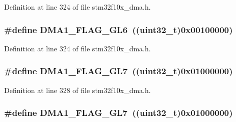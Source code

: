 Definition at line 324 of file stm32f10x\+\_\+dma.\+h.

\subsubsection[{\texorpdfstring{D\+M\+A1\+\_\+\+F\+L\+A\+G\+\_\+\+G\+L6}{DMA1_FLAG_GL6}}]{\setlength{\rightskip}{0pt plus 5cm}\#define D\+M\+A1\+\_\+\+F\+L\+A\+G\+\_\+\+G\+L6~(({\bf uint32\+\_\+t})0x00100000)}\hypertarget{group___d_m_a__flags__definition_gab21d0196f89435f61bedd03d53edc093}{}\label{group___d_m_a__flags__definition_gab21d0196f89435f61bedd03d53edc093}


Definition at line 324 of file stm32f10x\+\_\+dma.\+h.

\subsubsection[{\texorpdfstring{D\+M\+A1\+\_\+\+F\+L\+A\+G\+\_\+\+G\+L7}{DMA1_FLAG_GL7}}]{\setlength{\rightskip}{0pt plus 5cm}\#define D\+M\+A1\+\_\+\+F\+L\+A\+G\+\_\+\+G\+L7~(({\bf uint32\+\_\+t})0x01000000)}\hypertarget{group___d_m_a__flags__definition_ga37e5e27ca5bf6f3211d2effda2ca7646}{}\label{group___d_m_a__flags__definition_ga37e5e27ca5bf6f3211d2effda2ca7646}


Definition at line 328 of file stm32f10x\+\_\+dma.\+h.

\subsubsection[{\texorpdfstring{D\+M\+A1\+\_\+\+F\+L\+A\+G\+\_\+\+G\+L7}{DMA1_FLAG_GL7}}]{\setlength{\rightskip}{0pt plus 5cm}\#define D\+M\+A1\+\_\+\+F\+L\+A\+G\+\_\+\+G\+L7~(({\bf uint32\+\_\+t})0x01000000)}\hypertarget{group___d_m_a__flags__definition_ga37e5e27ca5bf6f3211d2effda2ca7646}{}\label{group___d_m_a__flags__definition_ga37e5e27ca5bf6f3211d2effda2ca7646}


